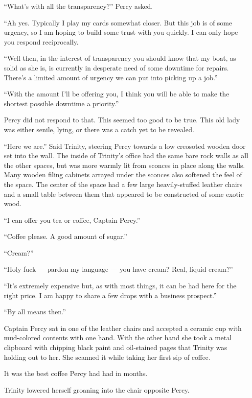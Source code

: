 \documentclass[
]{scrbook}
\begin{document}
``What's with all the transparency?'' Percy asked.

``Ah yes. Typically I play my cards somewhat closer. But this job is of
some urgency, so I am hoping to build some trust with you quickly. I can
only hope you respond reciprocally.

``Well then, in the interest of transparency you should know that my
boat, as solid as she is, is currently in desperate need of some
downtime for repairs. There's a limited amount of urgency we can put
into picking up a job.''

``With the amount I'll be offering you, I think you will be able to make
the shortest possible downtime a priority.''

Percy did not respond to that. This seemed too good to be true. This old
lady was either senile, lying, or there was a catch yet to be revealed.

``Here we are.'' Said Trinity, steering Percy towards a low creosoted
wooden door set into the wall. The inside of Trinity's office had the
same bare rock walls as all the other spaces, but was more warmly lit
from sconces in place along the walls. Many wooden filing cabinets
arrayed under the sconces also softened the feel of the space. The
center of the space had a few large heavily-stuffed leather chairs and a
small table between them that appeared to be constructed of some exotic
wood.

``I can offer you tea or coffee, Captain Percy.''

``Coffee please. A good amount of sugar.''

``Cream?''

``Holy fuck --- pardon my language --- you have cream? Real, liquid
cream?''

``It's extremely expensive but, as with most things, it can be had here
for the right price. I am happy to share a few drops with a business
prospect.''

``By all means then.''

Captain Percy sat in one of the leather chairs and accepted a ceramic
cup with mud-colored contents with one hand. With the other hand she
took a metal clipboard with chipping black paint and oil-stained pages
that Trinity was holding out to her. She scanned it while taking her
first sip of coffee.

It was the best coffee Percy had had in months.

Trinity lowered herself groaning into the chair opposite Percy.
\end{document}

